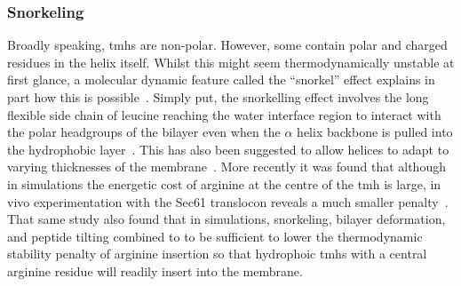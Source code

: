 
\subsubsection{Snorkeling}

Broadly speaking, \gls{tmh}s are non-polar. However, some contain polar and charged residues in the helix itself. Whilst this might seem thermodynamically unstable at first glance, a molecular dynamic feature called the ``snorkel'' effect explains in part how this is possible~\cite{Chamberlain2004, Strandberg2003}. Simply put, the snorkelling effect involves the long flexible side chain of leucine reaching the water interface region to interact with the polar headgroups of the bilayer even when the $\alpha$ helix backbone is pulled into the hydrophobic layer~\cite{Krishnakumar2007}. This has also been suggested to allow helices to adapt to varying thicknesses of the membrane~\cite{Kandasamy2006}. More recently it was found that although in simulations the energetic cost of arginine at the centre of the \gls{tmh} is large, in vivo experimentation with the Sec61 translocon reveals a much smaller penalty~\cite{Ulmschneider2017}. That same study also found that in simulations, snorkeling, bilayer deformation, and peptide tilting combined to to be sufficient to lower the thermodynamic stability penalty of arginine insertion so that hydrophoic \gls{tmh}s with a central arginine residue will readily insert into the membrane.


